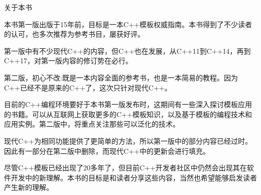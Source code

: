 \begin{flushright}
 关于本书
\end{flushright}

本书第一版出版于15年前，目标是一本C++模板权威指南。本书得到了不少读者的认可，也多次推荐为参考书目，屡获好评。

第一版中有不少现代C++的内容，但C++也在发展，从C++11到C++14，再到C++17，对第一版内容的修订势在必行。

第二版，初心不改:既是一本内容全面的参考书，也是一本简易的教程。因为C++已经不是原来的C++了，这次只针对现代C++。

目前的C++编程环境要好于本书第一版发布时，这期间有一些深入探讨模板应用的书籍。可以从互联网上获取更多的C++模板知识，以及基于模板的编程技术和应用实例。第二版中，将重点关注那些可以泛化的技术。

现代C++为相同功能提供了更简单的方法，所以第一版中的部分内容已经过时。因此有一部分在第二版中删除，而现代C++中的更新会进行填充。

尽管C++模板已经出现了20多年了，但目前C++开发者社区中仍然会出现其在软件开发中的新理解。本书的目标是和读者分享这些内容，当然也希望能够启发读者产生新的理解。